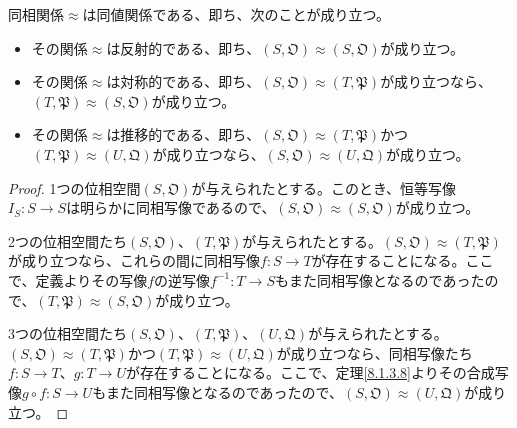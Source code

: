 \documentclass[dvipdfmx]{jsarticle}
\begin{document}
\begin{thm}\label{8.1.3.9}
同相関係$\approx$は同値関係である、即ち、次のことが成り立つ。
\begin{itemize}
\item
  その関係$\approx$は反射的である、即ち、$\left( S,\mathfrak{O} \right) \approx \left( S,\mathfrak{O} \right)$が成り立つ。
\item
  その関係$\approx$は対称的である、即ち、$\left( S,\mathfrak{O} \right) \approx \left( T,\mathfrak{P} \right)$が成り立つなら、$\left( T,\mathfrak{P} \right) \approx \left( S,\mathfrak{O} \right)$が成り立つ。
\item
  その関係$\approx$は推移的である、即ち、$\left( S,\mathfrak{O} \right) \approx \left( T,\mathfrak{P} \right)$かつ$\left( T,\mathfrak{P} \right) \approx \left( U,\mathfrak{Q} \right)$が成り立つなら、$\left( S,\mathfrak{O} \right) \approx \left( U,\mathfrak{Q} \right)$が成り立つ。
\end{itemize}
\end{thm}
\begin{proof}
1つの位相空間$\left( S,\mathfrak{O} \right)$が与えられたとする。このとき、恒等写像$I_{S}:S \rightarrow S$は明らかに同相写像であるので、$\left( S,\mathfrak{O} \right) \approx \left( S,\mathfrak{O} \right)$が成り立つ。\par
2つの位相空間たち$\left( S,\mathfrak{O} \right)$、$\left( T,\mathfrak{P} \right)$が与えられたとする。$\left( S,\mathfrak{O} \right) \approx \left( T,\mathfrak{P} \right)$が成り立つなら、これらの間に同相写像$f:S \rightarrow T$が存在することになる。ここで、定義よりその写像$f$の逆写像$f^{- 1}:T \rightarrow S$もまた同相写像となるのであったので、$\left( T,\mathfrak{P} \right) \approx \left( S,\mathfrak{O} \right)$が成り立つ。\par
3つの位相空間たち$\left( S,\mathfrak{O} \right)$、$\left( T,\mathfrak{P} \right)$、$\left( U,\mathfrak{Q} \right)$が与えられたとする。$\left( S,\mathfrak{O} \right) \approx \left( T,\mathfrak{P} \right)$かつ$\left( T,\mathfrak{P} \right) \approx \left( U,\mathfrak{Q} \right)$が成り立つなら、同相写像たち$f:S \rightarrow T$、$g:T \rightarrow U$が存在することになる。ここで、定理\ref{8.1.3.8}よりその合成写像$g \circ f:S \rightarrow U$もまた同相写像となるのであったので、$\left( S,\mathfrak{O} \right) \approx \left( U,\mathfrak{Q} \right)$が成り立つ。
\end{proof}
\end{document}

